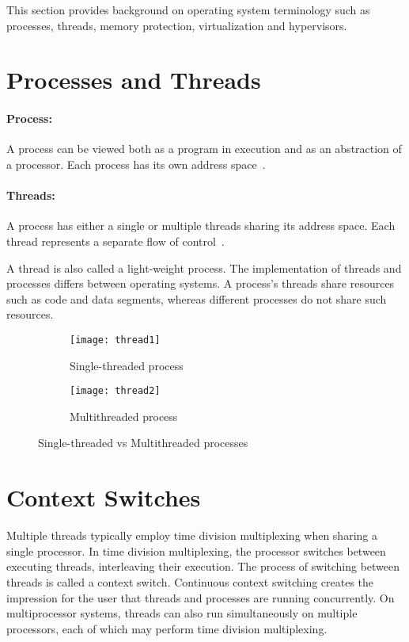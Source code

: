 This section provides background on operating system terminology such
as processes, threads, memory protection, virtualization and hypervisors.

\section{Processes and Threads}
\paragraph{Process:} A process can be viewed both as a program in execution
and as an abstraction of a processor. Each process has its own address
space~\cite{Galvin}.

\paragraph{Threads:} A process has either a single or multiple threads
sharing its address space. Each thread represents a separate flow of
control~\cite{Galvin}.

A thread is also called a light-weight process. The implementation of
threads and processes differs between operating systems. A process's 
threads share resources such as code and data segments, whereas 
different processes do not share such resources.
\begin{figure}[!ht]
    \centering
    \begin{subfigure}[b]{0.45\textwidth}
	\texttt{[image: thread1]}
	\caption{Single-threaded process}
	\label{fig:thread1}
    \end{subfigure}
	\hfill
    \begin{subfigure}[b]{0.45\textwidth}
	\texttt{[image: thread2]}
	\caption{Multithreaded process}
	\label{fig:thread2}
    \end{subfigure}
    \caption{Single-threaded vs Multithreaded processes}\label{fig:threads}
\end{figure}

\section{Context Switches}
Multiple threads typically employ time division multiplexing when sharing
a single processor.  In time division multiplexing, the processor switches
between executing threads, interleaving their execution. The process of 
switching between threads is called a context switch. Continuous context switching
creates the impression for the user that threads and processes are
running concurrently. On multiprocessor systems, threads can also run
simultaneously on multiple processors, each of which may perform time
division multiplexing.

